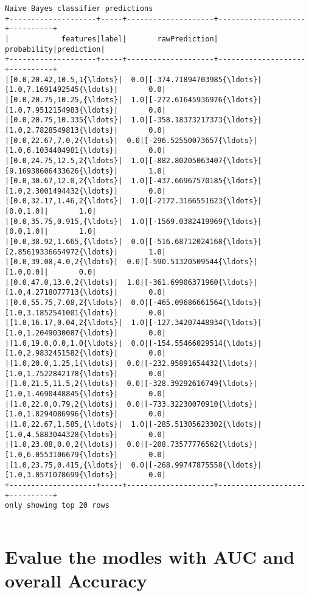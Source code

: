 \documentclass{report}
\begin{document}
\begin{Verbatim}[commandchars=\\\{\}]
Naive Bayes classifier predictions
+--------------------+-----+--------------------+--------------------+----------+
|            features|label|       rawPrediction|         probability|prediction|
+--------------------+-----+--------------------+--------------------+----------+
|[0.0,20.42,10.5,1{\ldots}|  0.0|[-374.71894703985{\ldots}|[1.0,7.1691492545{\ldots}|       0.0|
|[0.0,20.75,10.25,{\ldots}|  1.0|[-272.61645936976{\ldots}|[1.0,7.9512154983{\ldots}|       0.0|
|[0.0,20.75,10.335{\ldots}|  1.0|[-358.18373217373{\ldots}|[1.0,2.7828549813{\ldots}|       0.0|
|[0.0,22.67,7.0,2{\ldots}|  0.0|[-296.52550073657{\ldots}|[1.0,6.1034404981{\ldots}|       0.0|
|[0.0,24.75,12.5,2{\ldots}|  1.0|[-882.80205063407{\ldots}|[9.16938606433626{\ldots}|       1.0|
|[0.0,30.67,12.0,2{\ldots}|  1.0|[-437.66967570185{\ldots}|[1.0,2.3001494432{\ldots}|       0.0|
|[0.0,32.17,1.46,2{\ldots}|  1.0|[-2172.3166551623{\ldots}|           [0.0,1.0]|       1.0|
|[0.0,35.75,0.915,{\ldots}|  1.0|[-1569.0382419969{\ldots}|           [0.0,1.0]|       1.0|
|[0.0,38.92,1.665,{\ldots}|  0.0|[-516.68712024168{\ldots}|[2.85619336654972{\ldots}|       1.0|
|[0.0,39.08,4.0,2{\ldots}|  0.0|[-590.51320509544{\ldots}|           [1.0,0.0]|       0.0|
|[0.0,47.0,13.0,2{\ldots}|  1.0|[-361.69906371960{\ldots}|[1.0,4.2718077713{\ldots}|       0.0|
|[0.0,55.75,7.08,2{\ldots}|  0.0|[-465.09686661564{\ldots}|[1.0,3.1852541001{\ldots}|       0.0|
|[1.0,16.17,0.04,2{\ldots}|  1.0|[-127.34207448934{\ldots}|[1.0,1.2049030087{\ldots}|       0.0|
|[1.0,19.0,0.0,1.0{\ldots}|  0.0|[-154.55466029514{\ldots}|[1.0,2.9832451582{\ldots}|       0.0|
|[1.0,20.0,1.25,1{\ldots}|  0.0|[-232.95891654432{\ldots}|[1.0,1.7522842178{\ldots}|       0.0|
|[1.0,21.5,11.5,2{\ldots}|  0.0|[-328.39292616749{\ldots}|[1.0,1.4690448845{\ldots}|       0.0|
|[1.0,22.0,0.79,2{\ldots}|  0.0|[-733.32230070910{\ldots}|[1.0,1.8294086996{\ldots}|       0.0|
|[1.0,22.67,1.585,{\ldots}|  1.0|[-285.51305623302{\ldots}|[1.0,4.5883044328{\ldots}|       0.0|
|[1.0,23.08,0.0,2{\ldots}|  0.0|[-208.73577776562{\ldots}|[1.0,6.0553106679{\ldots}|       0.0|
|[1.0,23.75,0.415,{\ldots}|  0.0|[-268.99747875558{\ldots}|[1.0,3.0571078699{\ldots}|       0.0|
+--------------------+-----+--------------------+--------------------+----------+
only showing top 20 rows


    \end{Verbatim}

\section{Evalue the modles with AUC and overall
Accuracy}\label{evalue-the-modles-with-auc-and-overall-accuracy}
\end{document}

